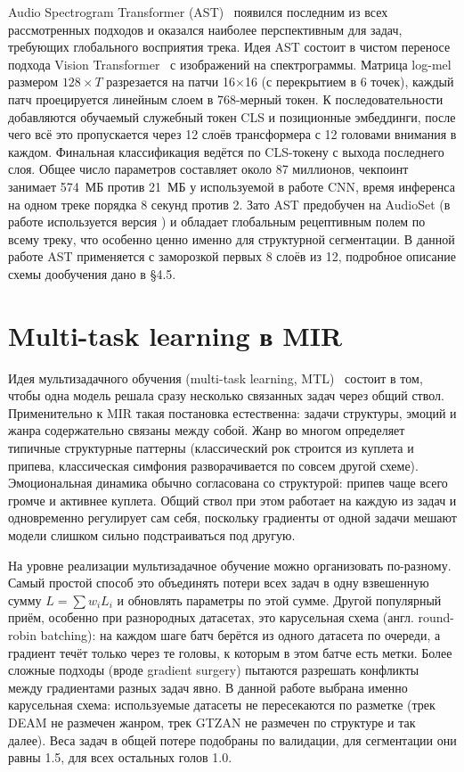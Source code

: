 Audio Spectrogram Transformer (AST)~\cite{gong2021ast} появился последним из всех рассмотренных подходов и оказался наиболее перспективным для задач, требующих глобального восприятия трека. Идея AST состоит в чистом переносе подхода Vision Transformer~\cite{dosovitskiy2021vit} с изображений на спектрограммы. Матрица log-mel размером $128 \times T$ разрезается на патчи 16$\times$16 (с перекрытием в 6 точек), каждый патч проецируется линейным слоем в 768-мерный токен. К последовательности добавляются обучаемый служебный токен CLS и позиционные эмбеддинги, после чего всё это пропускается через 12 слоёв трансформера с 12 головами внимания в каждом. Финальная классификация ведётся по CLS-токену с выхода последнего слоя. Общее число параметров составляет около 87 миллионов, чекпоинт занимает 574~МБ против 21~МБ у используемой в работе CNN, время инференса на одном треке порядка 8 секунд против 2. Зато AST предобучен на AudioSet (в работе используется версия ) и обладает глобальным рецептивным полем по всему треку, что особенно ценно именно для структурной сегментации. В данной работе AST применяется с заморозкой первых 8 слоёв из 12, подробное описание схемы дообучения дано в §4.5.

\section{Multi-task learning в MIR}\label{sec:1-6}

Идея мультизадачного обучения (multi-task learning, MTL)~\cite{caruana1997mtl} состоит в том, чтобы одна модель решала сразу несколько связанных задач через общий ствол. Применительно к MIR такая постановка естественна: задачи структуры, эмоций и жанра содержательно связаны между собой. Жанр во многом определяет типичные структурные паттерны (классический рок строится из куплета и припева, классическая симфония разворачивается по совсем другой схеме). Эмоциональная динамика обычно согласована со структурой: припев чаще всего громче и активнее куплета. Общий ствол при этом работает на каждую из задач и одновременно регулирует сам себя, поскольку градиенты от одной задачи мешают модели слишком сильно подстраиваться под другую.

На уровне реализации мультизадачное обучение можно организовать по-разному. Самый простой способ это объединять потери всех задач в одну взвешенную сумму $L = \sum w_i L_i$ и обновлять параметры по этой сумме. Другой популярный приём, особенно при разнородных датасетах, это карусельная схема (англ. round-robin batching): на каждом шаге батч берётся из одного датасета по очереди, а градиент течёт только через те головы, к которым в этом батче есть метки. Более сложные подходы (вроде gradient surgery) пытаются разрешать конфликты между градиентами разных задач явно. В данной работе выбрана именно карусельная схема: используемые датасеты не пересекаются по разметке (трек DEAM не размечен жанром, трек GTZAN не размечен по структуре и так далее). Веса задач в общей потере подобраны по валидации, для сегментации они равны 1.5, для всех остальных голов 1.0.

